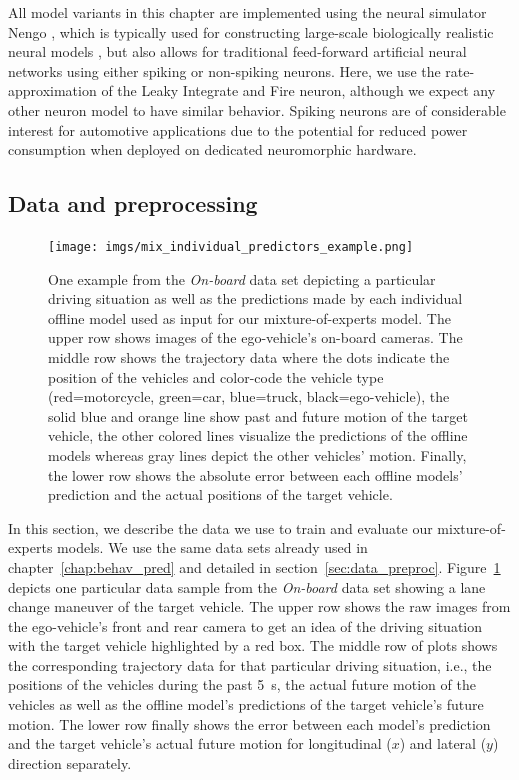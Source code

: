 All model variants in this chapter are implemented using the neural simulator Nengo \parencite{Bekolay2014}, which is typically used for constructing large-scale biologically realistic neural models \parencite{Eliasmith2013}, but also allows for traditional feed-forward artificial neural networks using either spiking or non-spiking neurons.
Here, we use the rate-approximation of the Leaky Integrate and Fire neuron, although we expect any other neuron model to have similar behavior.
Spiking neurons are of considerable interest for automotive applications due to the potential for reduced power consumption when deployed on dedicated neuromorphic hardware. 


\subsection{Data and preprocessing}%
\label{subsec:data_and_preprocessing}
\begin{figure}[th!]
    \centering
    \texttt{[image: imgs/mix\_individual\_predictors\_example.png]}
    \caption{One example from the \emph{On-board} data set depicting a particular driving situation as well as the predictions made by each individual offline model used as input for our mixture-of-experts model.
        The upper row shows images of the ego-vehicle's on-board cameras.
        The middle row shows the trajectory data where the dots indicate the position of the vehicles and color-code the vehicle type (red=motorcycle, green=car, blue=truck, black=ego-vehicle), the solid blue and orange line show past and future motion of the target vehicle, the other colored lines visualize the predictions of the offline models whereas gray lines depict the other vehicles' motion.
        Finally, the lower row shows the absolute error between each offline models' prediction and the actual positions of the target vehicle.
    }
    \label{fig:mix_individual_predictors_example}
\end{figure}

In this section, we describe the data we use to train and evaluate our mixture-of-experts models.
We use the same data sets already used in chapter~\ref{chap:behav_pred} and detailed in section~\ref{sec:data_preproc}.
Figure~\ref{fig:mix_individual_predictors_example} depicts one particular data sample from the \emph{On-board} data set showing a lane change maneuver of the target vehicle.
The upper row shows the raw images from the ego-vehicle's front and rear camera to get an idea of the driving situation with the target vehicle highlighted by a red box.
The middle row of plots shows the corresponding trajectory data for that particular driving situation, i.e., the positions of the vehicles during the past \SI{5}{\second}, the actual future motion of the vehicles as well as the offline model's predictions of the target vehicle's future motion.
The lower row finally shows the error between each model's prediction and the target vehicle's actual future motion for longitudinal ($x$) and lateral ($y$) direction separately.

